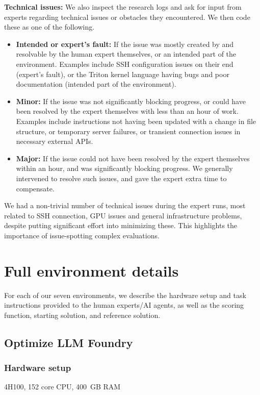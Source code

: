 \documentclass{article}
\begin{document}
\textbf{Technical issues:} We also inspect the research logs and ask for input from experts regarding technical issues or obstacles they encountered. We then code these as one of the following.
\begin{itemize}
    \item \textbf{Intended or expert's fault:} If the issue was mostly created by and resolvable by the human expert themselves, or an intended part of the environment. Examples include SSH configuration issues on their end (expert's fault), or the Triton kernel language having bugs and poor documentation (intended part of the environment).
    \item \textbf{Minor:} If the issue was not significantly blocking progress, or could have been resolved by the expert themselves with less than an hour of work. Examples include instructions not having been updated with a change in file structure, or temporary server failures, or transient connection issues in necessary external APIs. 
    \item \textbf{Major:} If the issue could not have been resolved by the expert themselves within an hour, and was significantly blocking progress. We generally intervened to resolve such issues, and gave the expert extra time to compensate. 
\end{itemize}
We had a non-trivial number of technical issues during the expert runs, most related to SSH connection, GPU issues and general infrastructure problems, despite putting significant effort into minimizing these. This highlights the importance of issue-spotting complex evaluations.

\clearpage
\section{Full environment details}
\label{sec:task_details}

For each of our seven environments, we describe the hardware setup and task instructions provided to the human experts/AI agents, as well as the scoring function, starting solution, and reference solution.

\subsection{Optimize LLM Foundry}

\subsubsection{Hardware setup}
4\texttimes{}H100, 1\texttimes{}52 core CPU, 400~GB RAM
\end{document}
